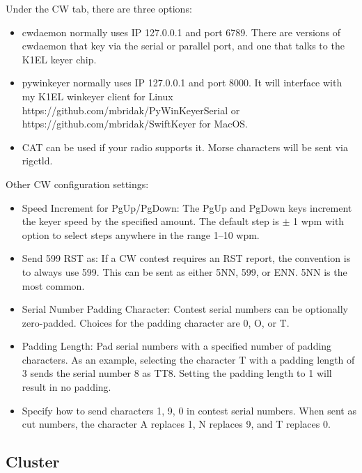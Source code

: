 \documentclass{article}
\begin{document}
Under the CW tab, there are three options:

\begin{itemize}
 \item cwdaemon normally uses IP 127.0.0.1 and port 6789. There are versions of cwdaemon that key via the serial or parallel port, and one that talks to the K1EL keyer chip.

 \item pywinkeyer normally uses IP 127.0.0.1 and port 8000. It will interface with my K1EL winkeyer client for Linux https://github.com/mbridak/PyWinKeyerSerial or https://github.com/mbridak/SwiftKeyer for MacOS.

 \item CAT can be used if your radio supports it. Morse characters will be sent via rigctld.
\end{itemize}

Other CW configuration settings:

\begin{itemize}
 \item Speed Increment for PgUp/PgDown: The PgUp and PgDown keys increment the keyer speed by the specified amount. The default step is $\pm$ 1 wpm with option to select steps anywhere in the range 1--10 wpm.
 
 \item Send 599 RST as: If a CW contest requires an RST report, the convention is to always use 599. This can be sent as either 5NN, 599, or ENN. 5NN is the most common.

 \item Serial Number Padding Character: Contest serial numbers can be optionally zero-padded. Choices for the padding character are 0, O, or T.

 \item Padding Length: Pad serial numbers with a specified number of padding characters. As an example, selecting the character T with a padding length of 3 sends the serial number 8 as TT8. Setting the padding length to 1 will result in no padding.

 \item Specify how to send characters 1, 9, 0 in contest serial numbers. When sent as cut numbers, the character A replaces 1, N replaces 9, and T replaces 0.
\end{itemize}

\subsection{Cluster}
\end{document}
